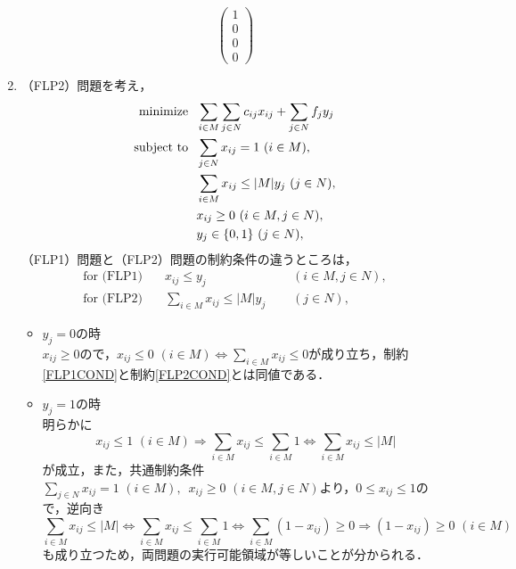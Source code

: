 \documentclass[a4paper,11pt]{jsarticle}
\numberwithin{theorem}{section}  %
\numberwithin{equation}{section} %
\newcommand{\minimize}{\mathop{\mathrm{\rm minimize}}\limits}
\begin{document}
\begin{enumerate}
\[\begin{pmatrix}
1 \\ 0 \\ 0 \\ 0
\end{pmatrix}
\]
\item
（FLP2）問題を考え，
\[
\begin{split}
\minimize &\,\,\,\,  \sum_{i \in M} \sum_{j \in N} c_{ij}x_{ij} + \sum_{j \in N} f_j y_j \\
\text{subject to} &\,\,\,\,  \sum_{j\in N} x_{ij} = 1 \,\, (i \in M),\\
&\,\,\,\,  \sum_{i \in M} x_{ij} \le |M|y_j \,\, (j \in N),\\
&\,\,\,\,  x_{ij} \ge 0 \,\, (i \in M, j \in N), \\
&\,\,\,\, y_j \in \{ 0,1 \} \,\, (j \in N),
\end{split}
\]
（FLP1）問題と（FLP2）問題の制約条件の違うところは，
\begin{eqnarray}
\text{for (FLP1)}\,\,\,\,\,\, & x_{ij} \le y_j \,\, &\,\,\,\,\,\, (i \in M, j \in N),　\label{FLP1COND}\\
\text{for (FLP2)}\,\,\,\,\,\, & \sum_{ i \in M} x_{ij} \le |M|y_j \,\, &\,\,\,\,\,\, (j \in N), \label{FLP2COND}
\end{eqnarray}
\begin{itemize}
\item $y_j=0$の時\\
$x_{ij}\ge0$ので，$x_{ij} \le 0 \,\, (i \in M) \Leftrightarrow \sum_{i \in M} x_{ij} \le 0$が成り立ち，制約\ref{FLP1COND}と制約\ref{FLP2COND}とは同値である．
\item $y_j=1$の時\\
明らかに
\[
x_{ij} \le 1 \,\, (i \in M) \Rightarrow \sum_{i \in M} x_{ij} \le \sum_{i \in M} 1 \Leftrightarrow \sum_{i \in M} x_{ij} \le |M|
\]が成立，また，共通制約条件$\sum_{j\in N} x_{ij} = 1 \,\, (i \in M) ,\,\,\,x_{ij} \ge 0 \,\, (i \in M, j \in N)$より，$0 \le x_{ij} \le 1$ので，逆向き
\[
\sum_{i \in M} x_{ij} \le |M| \Leftrightarrow  \sum_{i \in M} x_{ij} \le \sum_{i \in M} 1
\Leftrightarrow \sum_{i \in M} (1-x_{ij}) \ge 0 
 \Rightarrow
(1 - x_{ij})\ge 0  \,\, (i \in M) 
\]も成り立つため，両問題の実行可能領域が等しいことが分かられる．


\end{itemize}
\end{enumerate}
\end{document}
